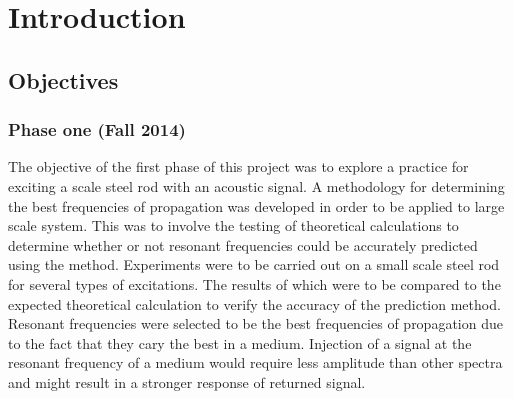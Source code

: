 
\chapter{Introduction}

\section{Objectives}

\subsection{Phase one (Fall 2014)}

The objective of the first phase of this project was to explore a practice for exciting a scale steel rod with an acoustic signal. A methodology for determining the best frequencies of propagation was developed in order to be applied to large scale system. This was to involve the testing of theoretical calculations to determine whether or not resonant frequencies could be accurately predicted using the method. Experiments were to be carried out on a small scale steel rod for several types of excitations. The results of which were to be compared to the expected theoretical calculation to verify the accuracy of the prediction method. Resonant frequencies were selected to be the best frequencies of propagation due to the fact that they cary the best in a medium. Injection of a signal at the resonant frequency of a medium would require less amplitude than other spectra and might result in a stronger response of returned signal. 

